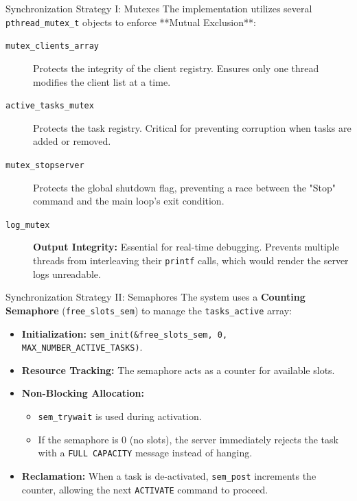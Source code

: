 \begin{frame}{Synchronization Strategy I: Mutexes}
    The implementation utilizes several \texttt{pthread\_mutex\_t} objects to enforce **Mutual Exclusion**:
    \begin{description}
        \item[\texttt{mutex\_clients\_array}] Protects the integrity of the client registry. Ensures only one thread modifies the client list at a time.
        \item[\texttt{active\_tasks\_mutex}] Protects the task registry. Critical for preventing corruption when tasks are added or removed.
        \item[\texttt{mutex\_stopserver}] Protects the global shutdown flag, preventing a race between the "Stop" command and the main loop's exit condition.
        \item[\texttt{log\_mutex}] \textbf{Output Integrity:} Essential for real-time debugging. Prevents multiple threads from interleaving their \texttt{printf} calls, which would render the server logs unreadable.
    \end{description}
\end{frame}

\begin{frame}{Synchronization Strategy II: Semaphores}
    The system uses a \textbf{Counting Semaphore} (\texttt{free\_slots\_sem}) to manage the \texttt{tasks\_active} array:
    \begin{itemize}
        \item \textbf{Initialization:} \texttt{sem\_init(\&free\_slots\_sem, 0, MAX\_NUMBER\_ACTIVE\_TASKS)}.
        \item \textbf{Resource Tracking:} The semaphore acts as a counter for available slots.
        \item \textbf{Non-Blocking Allocation:} 
        \begin{itemize}
            \item \texttt{sem\_trywait} is used during activation. 
            \item If the semaphore is 0 (no slots), the server immediately rejects the task with a \texttt{FULL CAPACITY} message instead of hanging.
        \end{itemize}
        \item \textbf{Reclamation:} When a task is de-activated, \texttt{sem\_post} increments the counter, allowing the next \texttt{ACTIVATE} command to proceed.
    \end{itemize}
\end{frame}

